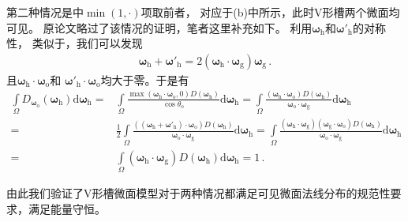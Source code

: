 第二种情况是中$\min(1,\cdot)$项取前者，
对应于(b)中所示，此时V形槽两个微面均可见。
原论文略过了该情况的证明，笔者这里补充如下。
利用${\bm\omega}_{\mathrm{h}}$和${\bm\omega}'_{\mathrm{h}}$的对称性，
类似于，我们可以发现
\begin{align}
    {\bm\omega}_{\mathrm{h}}+{\bm\omega}'_{\mathrm{h}}
    =2({\bm\omega}_{\mathrm{h}}\cdot{\bm\omega}_{\mathrm{g}}){\bm\omega}_{\mathrm{g}}\, .
\end{align}
且${\bm\omega}_{\mathrm{h}}\cdot{\bm\omega}_{\mathrm{o}}$和
${\bm\omega}'_{\mathrm{h}}\cdot{\bm\omega}_{\mathrm{o}}$均大于零。于是有
\begin{align}
    \int\limits_{\varOmega}D_{{\bm\omega}_{\mathrm{o}}}({\bm\omega}_{\mathrm{h}})
    \mathrm{d}{\bm\omega}_{\mathrm{h}}
    = & \int\limits_{\varOmega}\frac{\max({\bm\omega}_{\mathrm{h}}\cdot{\bm\omega}_{\mathrm{o}},0)
        D({\bm\omega}_{\mathrm{h}})}{\cos\theta_{\mathrm{o}}}\mathrm{d}{\bm\omega}_{\mathrm{h}}
    =\int\limits_{\varOmega}\frac{({\bm\omega}_{\mathrm{h}}\cdot{\bm\omega}_{\mathrm{o}})
    D({\bm\omega}_{\mathrm{h}})}{{\bm\omega}_{\mathrm{o}}\cdot{\bm\omega}_{\mathrm{g}}}\mathrm{d}{\bm\omega}_{\mathrm{h}}\nonumber  \\
    = & \frac{1}{2}\int\limits_{\varOmega}\frac{(({\bm\omega}_{\mathrm{h}}+{\bm\omega}'_{\mathrm{h}})\cdot{\bm\omega}_{\mathrm{o}})
    D({\bm\omega}_{\mathrm{h}})}{{\bm\omega}_{\mathrm{o}}\cdot{\bm\omega}_{\mathrm{g}}}\mathrm{d}{\bm\omega}_{\mathrm{h}}
    =\int\limits_{\varOmega}\frac{({\bm\omega}_{\mathrm{h}}\cdot{\bm\omega}_{\mathrm{g}})
    ({\bm\omega}_{\mathrm{g}}\cdot{\bm\omega}_{\mathrm{o}})
    D({\bm\omega}_{\mathrm{h}})}{{\bm\omega}_{\mathrm{o}}\cdot{\bm\omega}_{\mathrm{g}}}\mathrm{d}{\bm\omega}_{\mathrm{h}}\nonumber  \\
    = & \int\limits_{\varOmega}({\bm\omega}_{\mathrm{h}}\cdot{\bm\omega}_{\mathrm{g}})
    D({\bm\omega}_{\mathrm{h}})\mathrm{d}{\bm\omega}_{\mathrm{h}}=1\, .
\end{align}

由此我们验证了V形槽微面模型对于两种情况都满足可见微面法线分布的规范性要求，满足能量守恒。

